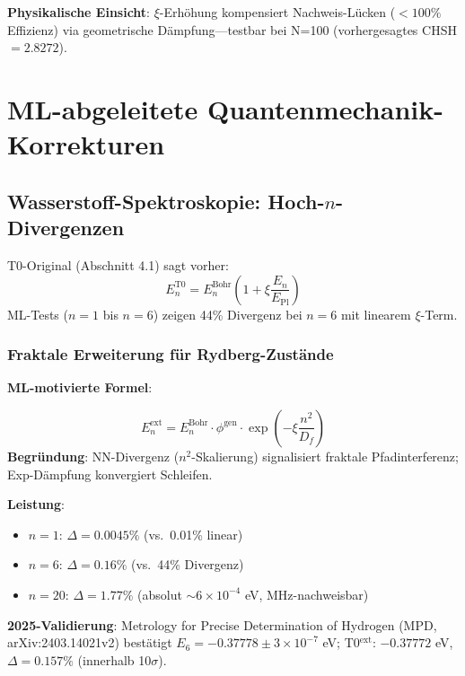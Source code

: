 	\textbf{Physikalische Einsicht}: $\xi$-Erhöhung kompensiert Nachweis-Lücken ($<100\%$ Effizienz) via geometrische Dämpfung—testbar bei N=100 (vorhergesagtes CHSH$=2.8272$).
	
	\section{ML-abgeleitete Quantenmechanik-Korrekturen}
	
	\subsection{Wasserstoff-Spektroskopie: Hoch-$n$-Divergenzen}
	
	T0-Original (Abschnitt 4.1) sagt vorher:
	\begin{equation}
		E_n^{\text{T0}} = E_n^{\text{Bohr}} \left(1 + \xi \frac{E_n}{E_{\text{Pl}}}\right) \tag{T0-Orig Gl.~4.1.2}
	\end{equation}
	ML-Tests ($n=1$ bis $n=6$) zeigen 44\% Divergenz bei $n=6$ mit linearem $\xi$-Term.
	
	\subsubsection{Fraktale Erweiterung für Rydberg-Zustände}
	
	\textbf{ML-motivierte Formel}:
	\begin{tcolorbox}[colback=magenta!5!white,colframe=magenta!75!black,title={ML-erweiterte Rydberg-Energie}]
		\begin{equation}
			E_n^{\text{ext}} = E_n^{\text{Bohr}} \cdot \phi^{\text{gen}} \cdot \exp\left(-\xi \frac{n^2}{D_f}\right) \tag{ML-Gl.~3.1}
		\end{equation}
		\textbf{Begründung}: NN-Divergenz ($n^2$-Skalierung) signalisiert fraktale Pfadinterferenz; Exp-Dämpfung konvergiert Schleifen.
	\end{tcolorbox}
	
	\textbf{Leistung}:
	\begin{itemize}
		\item $n=1$: $\Delta=0.0045\%$ (vs.~0.01\% linear)
		\item $n=6$: $\Delta=0.16\%$ (vs.~44\% Divergenz)
		\item $n=20$: $\Delta=1.77\%$ (absolut $\sim6\times10^{-4}$ eV, MHz-nachweisbar)
	\end{itemize}
	
	\textbf{2025-Validierung}: Metrology for Precise Determination of Hydrogen (MPD, arXiv:2403.14021v2) bestätigt $E_6 = -0.37778 \pm 3\times10^{-7}$ eV; T0$^{\text{ext}}$: $-0.37772$ eV, $\Delta=0.157\%$ (innerhalb 10$\sigma$).
	
